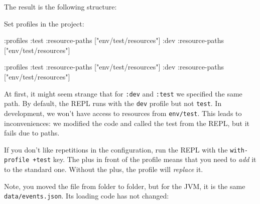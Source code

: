 \fi

\noindent
The result is the following structure:

\begin{english}
\end{english}


\linegap

\noindent
Set profiles in the project:

\ifx\DEVICETYPE\MOBILE

\begin{english}
  \begin{clojure}
:profiles {:test {:resource-paths
                  ["env/test/resources"]}
           :dev {:resource-paths
                 ["env/test/resources"]}}
  \end{clojure}
\end{english}

\else

\begin{english}
  \begin{clojure}
:profiles {:test {:resource-paths ["env/test/resources"]}
           :dev  {:resource-paths ["env/test/resources"]}}
  \end{clojure}
\end{english}

\fi

At first, it might seem strange that for \verb|:dev| and \verb|:test| we specified the same path. By default, the REPL runs with the \verb|dev| profile but not \verb|test|. In development, we won't have access to resources from \verb|env/test|. This leads to inconveniences: we modified the code and called the test from the REPL, but it fails due to paths.


\mnoindent
If you don't like repetitions in the configuration, run the REPL with the \verb|with-profile +test| key. The plus in front of the profile means that you need to \emph{add} it to the standard one. Without the plus, the profile will \emph{replace} it.


Note, you moved the file from folder to folder, but for the JVM, it is the same \verb|data/events.json|. Its loading code has not changed:

